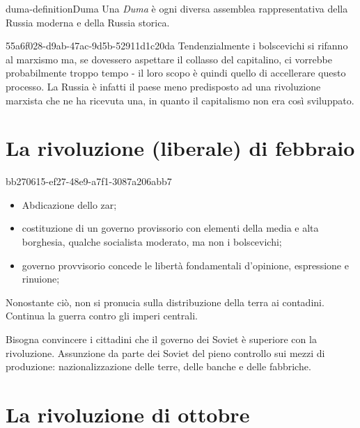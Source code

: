 \documentclass[preview]{standalone}
\begin{document}
\begin{snippetdefinition}{duma-definition}{Duma}
    Una \textit{Duma} è ogni diversa assemblea rappresentativa della Russia moderna e della Russia storica.
\end{snippetdefinition}

\begin{snippet}{55a6f028-d9ab-47ac-9d5b-52911d1c20da}
    Tendenzialmente i bolscevichi si rifanno al marxismo ma,
    se dovessero aspettare il collasso del capitalino, ci vorrebbe probabilmente troppo
    tempo - il loro scopo è quindi quello di accellerare questo processo.
    La Russia è infatti il paese meno predisposto ad una rivoluzione marxista che ne ha ricevuta una,
    in quanto il capitalismo non era così sviluppato.
\end{snippet}

\section{La rivoluzione (liberale) di febbraio}

\begin{snippet}{bb270615-ef27-48e9-a7f1-3087a206abb7}
    \begin{itemize}
        \item Abdicazione dello zar;
        \item costituzione di un governo provissorio con elementi della media e alta borghesia, qualche socialista moderato, ma non i bolscevichi;
        \item governo provvisorio concede le libertà fondamentali d'opinione, espressione e rinuione;
    \end{itemize}
    
    Nonostante ciò, non si pronucia sulla distribuzione della terra ai contadini.
    Continua la guerra contro gli imperi centrali.
    
    
    Bisogna convincere i cittadini che il governo dei Soviet è superiore
    con la rivoluzione.
    Assunzione da parte dei Soviet del pieno controllo sui mezzi di produzione: nazionalizzazione delle terre, delle banche e delle fabbriche.
\end{snippet}

\section{La rivoluzione di ottobre}
\end{document}

